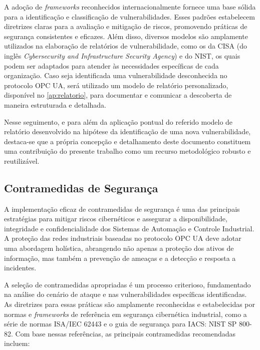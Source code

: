         A adoção de \textit{frameworks} reconhecidos internacionalmente fornece uma base sólida para a identificação e classificação de vulnerabilidades. Esses padrões estabelecem diretrizes claras para a avaliação e mitigação de riscos, promovendo práticas de segurança consistentes e eficazes. Além disso, diversos modelos são amplamente utilizados na elaboração de relatórios de vulnerabilidade, como os da CISA (do inglês \textit{Cybersecurity and Infrastructure Security Agency}) e do NIST, os quais podem ser adaptados para atender às necessidades específicas de cada organização. Caso seja identificada uma vulnerabilidade desconhecida no protocolo OPC UA, será utilizado um modelo de relatório personalizado, disponível no \autoref{ap:relatorio}, para documentar e comunicar a descoberta de maneira estruturada e detalhada.

        Nesse seguimento, e para além da aplicação pontual do referido modelo de relatório desenvolvido na hipótese da identificação de uma nova vulnerabilidade, destaca-se que a própria concepção e detalhamento deste documento constituem uma contribuição do presente trabalho como um recurso metodológico robusto e reutilizável.

    \subsection{Contramedidas de Segurança}

        A implementação eficaz de contramedidas de segurança é uma das principais estratégias para mitigar riscos cibernéticos e assegurar a disponibilidade, integridade e confidencialidade dos Sistemas de Automação e Controle Industrial. A proteção das redes industriais baseadas no protocolo OPC UA deve adotar uma abordagem holística, abrangendo não apenas a proteção dos ativos de informação, mas também a prevenção de ameaças e a detecção e resposta a incidentes.

        A seleção de contramedidas apropriadas é um processo criterioso, fundamentado na análise do cenário de ataque e nas vulnerabilidades específicas identificadas. As diretrizes para essas práticas são amplamente reconhecidas e estabelecidas por normas e \textit{frameworks} de referência em segurança cibernética industrial, como a série de normas ISA/IEC 62443 e o guia de segurança para IACS: NIST SP 800-82. Com base nessas referências, as principais contramedidas recomendadas incluem:
        
